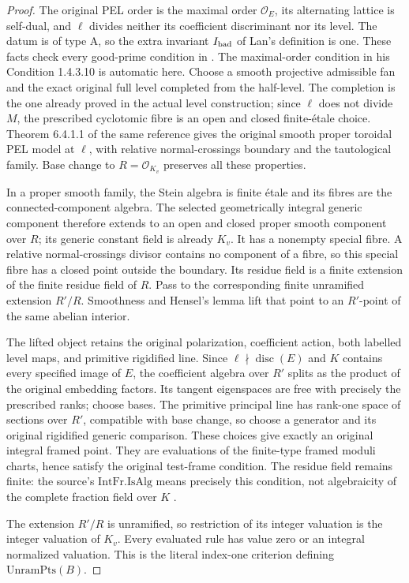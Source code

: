 \begin{proof}
The original PEL order is the maximal order $\mathcal O_E$,
its alternating lattice is self-dual, and $\ell$ divides neither
its coefficient discriminant nor its level.  The datum is of type A,
so the extra invariant $I_{\rm bad}$ of Lan's definition is one.
These facts check every good-prime condition in
\cite[Definition 1.4.1.1]{theta-twist-lan}.  The maximal-order
condition in his Condition 1.4.3.10 is automatic here.
Choose a smooth projective admissible fan and the exact original
full level completed from the half-level.  The completion is the
one already proved in the actual level construction; since $\ell$
does not divide $M$, the prescribed cyclotomic fibre is an open and
closed finite-\'etale choice.  Theorem 6.4.1.1 of the same reference
gives the original smooth proper toroidal PEL model at $\ell$,
with relative normal-crossings boundary and the tautological family.
Base change to $R=\mathcal O_{K_v}$ preserves all these properties.

In a proper smooth family, the Stein algebra is finite \'etale and
its fibres are the connected-component algebra.  The selected
geometrically integral generic component therefore extends to an
open and closed proper smooth component over $R$; its generic
constant field is already $K_v$.  It has a nonempty special fibre.
A relative normal-crossings divisor contains no component of a
fibre, so this special fibre has a closed point outside the
boundary.  Its residue field is a finite extension of the finite
residue field of $R$.  Pass to the corresponding finite unramified
extension $R'/R$.  Smoothness and Hensel's lemma lift that point to
an $R'$-point of the same abelian interior.

The lifted object retains the original polarization, coefficient
action, both labelled level maps, and primitive rigidified line.
Since $\ell\nmid\operatorname{disc}(E)$ and $K$ contains every
specified image of $E$, the coefficient algebra over $R'$ splits
as the product of the original embedding factors.  Its tangent
eigenspaces are free with precisely the prescribed ranks; choose
bases.  The primitive principal line has rank-one space of sections
over $R'$, compatible with base change, so choose a generator and
its original rigidified generic comparison.  These choices give
exactly an original integral framed point.  They are evaluations
of the finite-type framed moduli charts, hence satisfy the original
test-frame condition.  The residue field remains finite: the
source's $\mathrm{IntFr.IsAlg}$ means precisely this condition,
not algebraicity of the complete fraction field over $K$
\cite{theta-twist-source}.

The extension $R'/R$ is unramified, so restriction of its integer
valuation is the integer valuation of $K_v$.  Every evaluated rule
has value zero or an integral normalized valuation.  This is the
literal index-one criterion defining $\mathrm{UnramPts}(B)$.
\end{proof}

